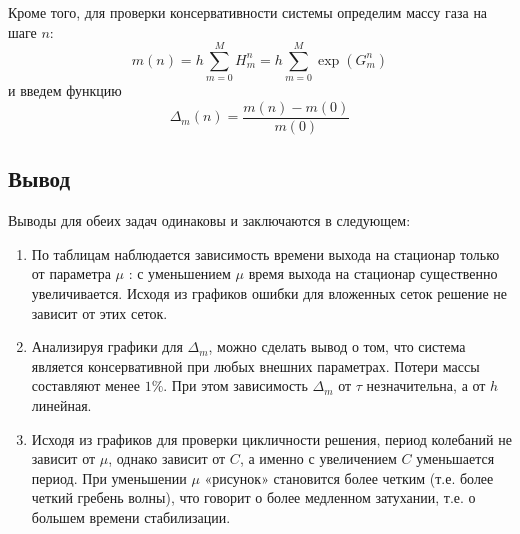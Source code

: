 Кроме того, для проверки консервативности системы определим массу газа на шаге $n$:
$$ 
  m(n) = h \sum_{m=0}^{M} H_{m}^{n} 
       = h \sum_{m=0}^{M} \exp (G_{m}^{n}) 
$$
и введем функцию
$$ 
  \Delta_{m}(n) = \frac{m(n)-m(0)}{m(0)} 
$$

\newpage

\newpage


\newpage
\subsection{Вывод}
Выводы для обеих задач одинаковы и заключаются в следующем:
\begin{enumerate}
  \item По таблицам наблюдается зависимость времени выхода на стационар только от параметра $\mu$ : с уменьшением $\mu$ время выхода на стационар существенно увеличивается. Исходя из графиков ошибки для вложенных сеток решение не зависит от этих сеток.
  \item Анализируя графики для $\Delta_{m}$, можно сделать вывод о том, что система является консервативной при любых внешних параметрах. Потери массы составляют менее $1\%$. При этом зависимость $\Delta_{m}$ от $\tau$ незначительна, а от $h$ линейная. 
  \item Исходя из графиков для проверки цикличности решения, период колебаний не зависит от $\mu$, однако зависит от $C$, а именно с увеличением $C$ уменьшается период. При уменьшении $\mu$ «рисунок» становится более четким (т.е. более четкий гребень волны), что говорит о более медленном затухании, т.е. о большем времени стабилизации.
\end{enumerate}